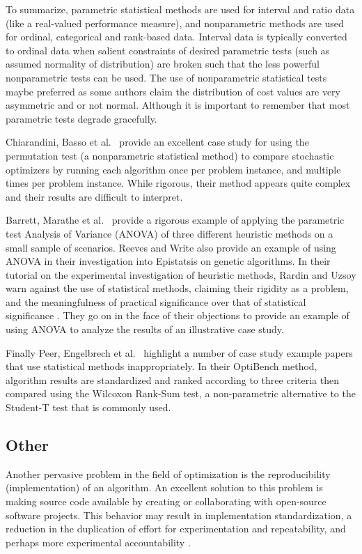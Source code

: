 To summarize, parametric statistical methods are used for interval and ratio data (like a real-valued performance measure), and nonparametric methods are used for ordinal, categorical and rank-based data. Interval data is typically converted to ordinal data when salient constraints of desired parametric tests (such as assumed normality of distribution) are broken such that the less powerful nonparametric tests can be used. The use of nonparametric statistical tests maybe preferred as some authors \cite{Peer2003, Chiarandini2005} claim the distribution of cost values are very asymmetric and or not normal. Although it is important to remember that most parametric tests degrade gracefully.

Chiarandini, Basso et al.\ \cite{Chiarandini2005} provide an excellent case study for using the permutation test (a nonparametric statistical method) to compare stochastic optimizers by running each algorithm once per problem instance, and multiple times per problem instance. While rigorous, their method appears quite complex and their results are difficult to interpret.

Barrett, Marathe et al.\ \cite{Barrett2003} provide a rigorous example of applying the parametric test Analysis of Variance (ANOVA) of three different heuristic methods on a small sample of scenarios. Reeves and Write \cite{Reeves1995, Reeves1995a} also provide an example of using ANOVA in their investigation into Epistatsis on genetic algorithms. In their tutorial on the experimental investigation of heuristic methods, Rardin and Uzsoy \cite{Rardin2001} warn against the use of statistical methods, claiming their rigidity as a problem, and the meaningfulness of practical significance over that of statistical significance . They go on in the face of their objections to provide an example of using ANOVA to analyze the results of an illustrative case study.

Finally Peer, Engelbrech et al.\ \cite{Peer2003} highlight a number of case study example papers that use statistical methods inappropriately. In their OptiBench method, algorithm results are standardized and ranked according to three criteria then compared using the Wilcoxon Rank-Sum test, a non-parametric alternative to the Student-T test that is commonly used.

% 
% 
\subsection{Other}
Another pervasive problem in the field of optimization is the reproducibility (implementation) of an algorithm. An excellent solution to this problem is making source code available by creating or collaborating with open-source software projects. This behavior may result in implementation standardization, a reduction in the duplication of effort for experimentation and repeatability, and perhaps more experimental accountability \cite{Eiben2002, Peer2003}.

